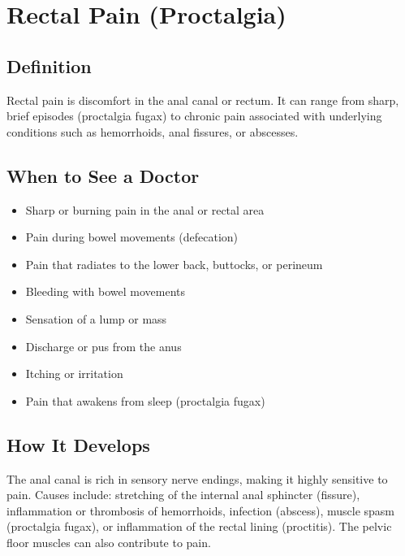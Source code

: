\chapter{Rectal Pain (Proctalgia)}

\section*{Definition}
Rectal pain is discomfort in the anal canal or rectum. It can range from sharp, brief episodes (proctalgia fugax) to chronic pain associated with underlying conditions such as hemorrhoids, anal fissures, or abscesses.

\section*{When to See a Doctor}
\begin{itemize}
\item Sharp or burning pain in the anal or rectal area
\item Pain during bowel movements (defecation)
\item Pain that radiates to the lower back, buttocks, or perineum
\item Bleeding with bowel movements
\item Sensation of a lump or mass
\item Discharge or pus from the anus
\item Itching or irritation
\item Pain that awakens from sleep (proctalgia fugax)
\end{itemize}

\section*{How It Develops}
The anal canal is rich in sensory nerve endings, making it highly sensitive to pain. Causes include: stretching of the internal anal sphincter (fissure), inflammation or thrombosis of hemorrhoids, infection (abscess), muscle spasm (proctalgia fugax), or inflammation of the rectal lining (proctitis). The pelvic floor muscles can also contribute to pain.

